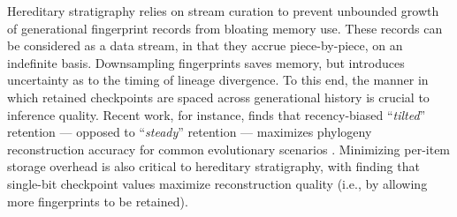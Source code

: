 Hereditary stratigraphy relies on stream curation to prevent unbounded growth of generational fingerprint records from bloating memory use.
These records can be considered as a data stream, in that they accrue piece-by-piece, on an indefinite basis.
Downsampling fingerprints saves memory, but introduces uncertainty as to the timing of lineage divergence.
To this end, the manner in which retained checkpoints are spaced across generational history is crucial to inference quality.
Recent work, for instance, finds that recency-biased ``\textit{tilted}'' retention --- opposed to ``\textit{steady}'' retention --- maximizes phylogeny reconstruction accuracy for common evolutionary scenarios \citep{moreno2024guide}.
Minimizing per-item storage overhead is also critical to hereditary stratigraphy, with \citet{moreno2024guide} finding that single-bit checkpoint values maximize reconstruction quality (i.e., by allowing more fingerprints to be retained).
